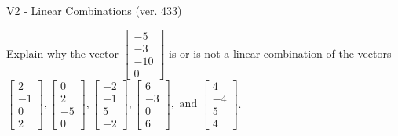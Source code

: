 \begin{exercise}
  \begin{exerciseTitle}V2 - Linear Combinations (ver. 433)\end{exerciseTitle}
  \begin{exerciseStatement}
    Explain why the vector \(\left[\begin{array}{c}
-5 \\
-3 \\
-10 \\
0
\end{array}\right]\)  is or is not a linear 
	combination of the vectors \(\left[\begin{array}{c}
2 \\
-1 \\
0 \\
2
\end{array}\right] , \left[\begin{array}{c}
0 \\
2 \\
-5 \\
0
\end{array}\right] , \left[\begin{array}{c}
-2 \\
-1 \\
5 \\
-2
\end{array}\right] , \left[\begin{array}{c}
6 \\
-3 \\
0 \\
6
\end{array}\right] , \text{ and } \left[\begin{array}{c}
4 \\
-4 \\
5 \\
4
\end{array}\right]\).
	



\end{exerciseStatement}
\end{exercise}
